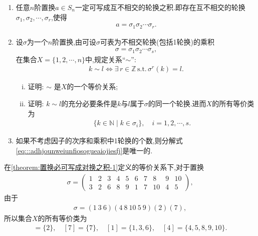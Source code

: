 \documentclass[../../main.tex]{subfiles}%
\begin{document}
\begin{theorem}\label{theorem:置换必可写成对换之积}
\begin{enumerate}[(1)]
\item\label{theorem:置换必可写成对换之积-2} 任意$n$阶置换$a \in S_n$一定可写成互不相交的轮换之积.即存在互不相交的轮换$\sigma_1,\sigma_2,\cdots,\sigma_r$,使得
\begin{align}\label{eq:::adhjounweiunfiosogueaiojiesfj}
a = \sigma_1\sigma_2\cdots\sigma_r.
\end{align}

\item\label{theorem:置换必可写成对换之积-1} 设$\sigma$为一个$n$阶置换,由可设$\sigma$可表为不相交轮换(包括1轮换)的乘积
\begin{align*}
\sigma = \sigma_1\sigma_2\cdots\sigma_s,
\end{align*}
在集合$X = \{1, 2, \cdots, n\}$中,规定关系“$\sim$”:
\begin{align*}
k \sim l \iff \exists \, r \in \mathbb{Z}\,\text{s.t.}\, \sigma^r(k) = l.
\end{align*}
\begin{enumerate}[(i)]
\item\label{theorem:置换必可写成对换之积-1-1} 证明: $\sim$ 是$X$的一个等价关系;

\item\label{theorem:置换必可写成对换之积-1-2} 证明: $k \sim l$的充分必要条件是$k$与$l$属于$\sigma$的同一个轮换.进而$X$的所有等价类为
\begin{align*}
\{k\in \mathbb{N}\mid k\in \sigma_i\},\quad i=1,2,\cdots,s.
\end{align*}

\end{enumerate}

\item\label{theorem:置换必可写成对换之积-0} 如果不考虑因子的次序和乘积中1轮换的个数,则分解式\eqref{eq:::adhjounweiunfiosogueaiojiesfj}是唯一的.
\end{enumerate}
\end{theorem}
\begin{remark}
在\ref{theorem:置换必可写成对换之积-1}定义的等价关系下,对于置换
\begin{align*}
\sigma = \begin{pmatrix} 1 & 2 & 3 & 4 & 5 & 6 & 7 & 8 & 9 & 10 \\ 3 & 2 & 6 & 8 & 9 & 1 & 7 & 10 & 4 & 5 \end{pmatrix},
\end{align*}
由于
\begin{align*}
\sigma = (1\ 3\ 6)(4\ 8\ 10\ 5\ 9)(2)(7),
\end{align*}
所以集合$X$的所有等价类为
\begin{align*}
[2] = \{2\},\quad [7] = \{7\},\quad [1] = \{1, 3, 6\},\quad [4] = \{4, 5, 8, 9, 10\}.
\end{align*}
\end{remark}
\end{document}
